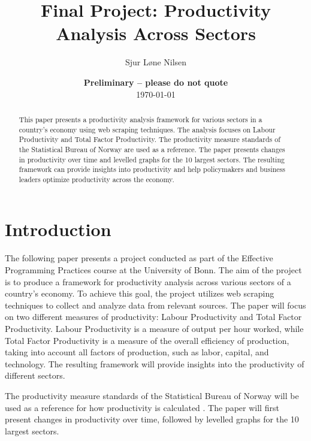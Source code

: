 \documentclass[11pt, a4paper, leqno]{article}
\begin{document}
\title{Final Project: Productivity Analysis Across Sectors}

\author{Sjur Løne Nilsen}

\date{
    {\bf Preliminary -- please do not quote}
    \\[1ex]
    \today
}

\maketitle


\begin{abstract}
    This paper presents a productivity analysis framework for various sectors in a country's 
    economy using web scraping techniques. The analysis focuses on Labour Productivity and 
    Total Factor Productivity. The productivity measure standards of the Statistical Bureau 
    of Norway are used as a reference. The paper presents changes in productivity over time 
    and levelled graphs for the 10 largest sectors. The resulting framework can provide 
    insights into productivity and help policymakers and business leaders optimize productivity 
    across the economy.
\end{abstract}

\clearpage


\section{Introduction} %
\label{sec:introduction}

The following paper presents a project conducted as part of the Effective Programming Practices 
course at the University of Bonn. The aim of the project is to produce a framework for 
productivity analysis across various sectors of a country's economy. To achieve this goal, the 
project utilizes web scraping techniques to collect and analyze data from relevant sources. The
 paper will focus on two different measures of productivity: Labour Productivity and Total 
 Factor Productivity. Labour Productivity is a measure of output per hour worked, while Total 
 Factor Productivity is a measure of the overall efficiency of production, taking into account 
 all factors of production, such as labor, capital, and technology. The resulting framework 
 will provide insights into the productivity of different sectors.

The productivity measure standards of the Statistical Bureau of Norway will be used as a 
reference for how productivity is calculated \cite{ssb_norway}. The paper will first present 
changes in productivity over time, followed by levelled graphs for the 10 largest sectors.
\end{document}
